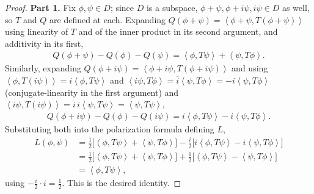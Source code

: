 \begin{proof}
    \leanok
\textbf{Part 1.} Fix $\phi, \psi \in D$; since $D$ is a subspace, $\phi + \psi, \phi + i\psi, i\psi \in D$ as well, so $T$ and $Q$ are defined at each. Expanding $Q(\phi+\psi) = \left< \phi+\psi, T(\phi+\psi) \right>$ using linearity of $T$ and of the inner product in its second argument, and additivity in its first,
\begin{align}
    Q(\phi+\psi) - Q(\phi) - Q(\psi) = \left< \phi, T\psi \right> + \left< \psi, T\phi \right>.
\end{align}
Similarly, expanding $Q(\phi + i\psi) = \left< \phi + i\psi, T(\phi + i\psi) \right>$ and using $\left< \phi, T(i\psi) \right> = i \left< \phi, T\psi \right>$ and $\left< i\psi, T\phi \right> = \overline{i} \left< \psi, T\phi \right> = -i \left< \psi, T\phi \right>$ (conjugate-linearity in the first argument) and $\left< i\psi, T(i\psi) \right> = \overline{i}\, i \left< \psi, T\psi \right> = \left< \psi, T\psi \right>$,
\begin{align}
    Q(\phi+i\psi) - Q(\phi) - Q(i\psi) = i\left< \phi, T\psi \right> - i \left< \psi, T\phi \right>.
\end{align}
Substituting both into the polarization formula defining $L$,
\begin{align}
    L(\phi, \psi) &= \frac{1}{2}\Big[ \left< \phi, T\psi \right> + \left< \psi, T\phi \right> \Big] - \frac{i}{2}\Big[ i\left< \phi, T\psi \right> - i\left< \psi, T\phi \right> \Big] \\
                  &= \frac{1}{2}\Big[ \left< \phi, T\psi \right> + \left< \psi, T\phi \right> \Big] + \frac{1}{2}\Big[ \left< \phi, T\psi \right> - \left< \psi, T\phi \right> \Big] \\
                  &= \left< \phi, T\psi \right>,
\end{align}
using $-\tfrac{i}{2}\cdot i = \tfrac{1}{2}$. This is the desired identity.


\end{proof}
